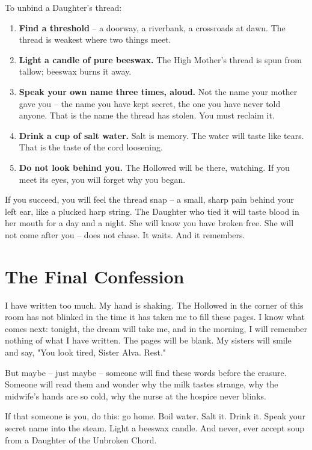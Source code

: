 \documentclass[10pt,a5paper]{book}
\begin{document}
To unbind a Daughter's thread:

\begin{enumerate}
    \item \textbf{Find a threshold} -- a doorway, a riverbank, a crossroads at dawn. The thread is weakest where two things meet.
    \item \textbf{Light a candle of pure beeswax.} The High Mother's thread is spun from tallow; beeswax burns it away.
    \item \textbf{Speak your own name three times, aloud.} Not the name your mother gave you -- the name you have kept secret, the one you have never told anyone. That is the name the thread has stolen. You must reclaim it.
    \item \textbf{Drink a cup of salt water.} Salt is memory. The water will taste like tears. That is the taste of the cord loosening.
    \item \textbf{Do not look behind you.} The Hollowed will be there, watching. If you meet its eyes, you will forget why you began.
\end{enumerate}

If you succeed, you will feel the thread snap -- a small, sharp pain behind your left ear, like a plucked harp string. The Daughter who tied it will taste blood in her mouth for a day and a night. She will know you have broken free. She will not come after you -- does not chase. It waits. And it remembers.

\section*{The Final Confession}

I have written too much. My hand is shaking. The Hollowed in the corner of this room has not blinked in the time it has taken me to fill these pages. I know what comes next: tonight, the dream will take me, and in the morning, I will remember nothing of what I have written. The pages will be blank. My sisters will smile and say, "You look tired, Sister Alva. Rest."

But maybe -- just maybe -- someone will find these words before the erasure. Someone will read them and wonder why the milk tastes strange, why the midwife's hands are so cold, why the nurse at the hospice never blinks.

If that someone is you, do this: go home. Boil water. Salt it. Drink it. Speak your secret name into the steam. Light a beeswax candle. And never, ever accept soup from a Daughter of the Unbroken Chord.
\end{document}
